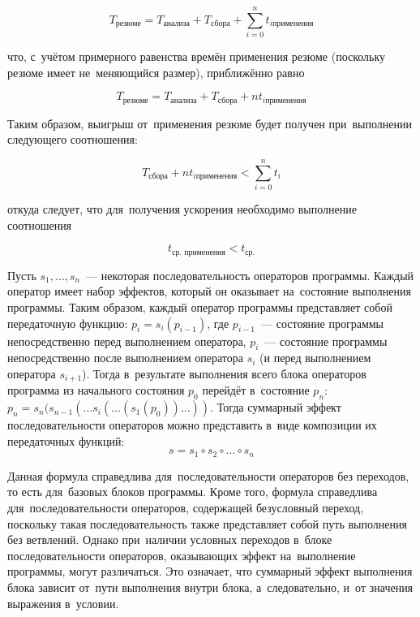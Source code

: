 \begin{equation}
 T_{\text{резюме}} = T_{\text{анализа}} + T_{\text{сбора}} + \sum_{i = 0}^{n} t_{i \text{применения}}
\end{equation}

что, с~учётом примерного равенства времён применения резюме (поскольку резюме имеет не~меняющийся размер), приближённо равно


\begin{equation}
 T_{\text{резюме}} = T_{\text{анализа}} + T_{\text{сбора}} + n t_{i \text{применения}}
\end{equation}

Таким образом, выигрыш от~применения резюме будет получен при~выполнении следующего соотношения:

\begin{equation}
 T_{\text{сбора}} + n t_{i \text{применения}} < \sum_{i = 0}^{n} t_{i}
\end{equation}

откуда следует, что для~получения ускорения необходимо выполнение соотношения

\begin{equation}
 t_{\text{ср. применения}} <  t_{\text{ср.}}
\end{equation}

Пусть $s_1, \ldots, s_n$~--- некоторая последовательность операторов программы. Каждый оператор имеет набор эффектов, который он оказывает на~состояние выполнения программы. Таким образом, каждый оператор программы представляет собой передаточную функцию: $p_i = s_i(p_{i-1})$, где $p_{i-1}$~--- состояние программы непосредственно перед выполнением оператора, $p_i$~--- состояние программы непосредственно после выполнением оператора  $s_i$ (и перед выполнением оператора $s_{i+1}$). Тогда в~результате выполнения всего блока операторов программа из начального состояния $p_0$ перейдёт в~состояние $p_n$: $p_n = s_n(s_{n-1}( \ldots s_i( \ldots (s_1(p_0)) \ldots ))$. Тогда суммарный эффект последовательности операторов можно представить в~виде композиции их передаточных функций:
\begin{equation}
 s = s_1 \circ s_2 \circ \ldots \circ s_n
\end{equation}

Данная формула справедлива для~последовательности операторов без переходов, то есть для~базовых блоков программы. Кроме того, формула справедлива для~последовательности операторов, содержащей безусловный переход, поскольку такая последовательность также представляет собой путь выполнения без ветвлений. Однако при~наличии условных переходов в~блоке последовательности операторов, оказывающих эффект на~выполнение программы, могут различаться. Это означает, что суммарный эффект выполнения блока зависит от~пути выполнения внутри блока, а~следовательно, и~от значения  выражения в~условии.

